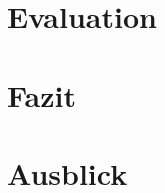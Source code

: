 \chapter{Evaluation}
\label{chap:Evaluation}

\chapter{Fazit}
\label{chap:Fazit}

\chapter{Ausblick}
\label{chap:Ausblick}